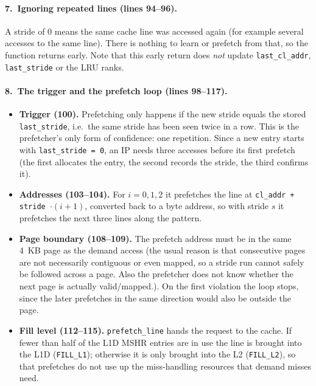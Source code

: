 \documentclass[11pt,a4paper]{article}
\begin{document}
\paragraph{7.\ Ignoring repeated lines (lines 94--96).}

A stride of 0 means the same cache line was accessed again (for example several accesses to the
same line). There is nothing to learn or prefetch from that, so the function returns early. Note
that this early return does \emph{not} update \texttt{last\_cl\_addr}, \texttt{last\_stride} or the
LRU ranks.

\paragraph{8.\ The trigger and the prefetch loop (lines 98--117).}

\begin{itemize}
    \item \textbf{Trigger (100).} Prefetching only happens if the new stride equals the stored
          \texttt{last\_stride}, i.e.\ the same stride has been seen twice in a row. This is the
          prefetcher's only form of confidence: one repetition. Since a new entry starts with
          \texttt{last\_stride = 0}, an IP needs three accesses before its first prefetch (the first
          allocates the entry, the second records the stride, the third confirms it).
    \item \textbf{Addresses (103--104).} For $i = 0,1,2$ it prefetches the line at
          \texttt{cl\_addr + stride $\cdot (i+1)$}, converted back to a byte address, so with stride $s$
          it prefetches the next three lines along the pattern. 
    \item \textbf{Page boundary (108--109).} The prefetch address must be in the same 4~KB page as
          the demand access (the usual reason is that consecutive
          pages are not necessarily contiguous or even mapped, so a stride run cannot safely be
          followed across a page. Also the prefetcher does not know whether the next page is actually valid/mapped.). On the first violation the loop
          stops, since the later prefetches in the same direction would also be outside the page.
    \item \textbf{Fill level (112--115).} \texttt{prefetch\_line} hands the request to the cache. If
          fewer than half of the L1D MSHR entries are in use the line is brought into the L1D
          (\texttt{FILL\_L1}); otherwise it is only brought into the L2 (\texttt{FILL\_L2}), so that
          prefetches do not use up the miss-handling resources that demand misses need.
\end{itemize}
\end{document}
